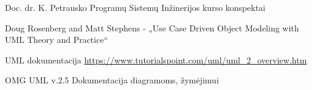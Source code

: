 \documentclass{VUMIFPSkursinis}
\begin{document}
\begin{enumerate}[label={[\arabic*]},itemsep=-2mm]
	\item Doc. dr. K. Petrausko Programų Sistemų Inžinerijos kurso konspektai
	\item Doug Rosenberg and Matt Stephens - „Use Case Driven Object Modeling with UML Theory and Practice“
	\item UML dokumentacija \url{https://www.tutorialspoint.com/uml/uml_2_overview.htm}
	\item OMG UML v.2.5 Dokumentacija diagramoms, žymėjimui
\end{enumerate}
\end{document}
